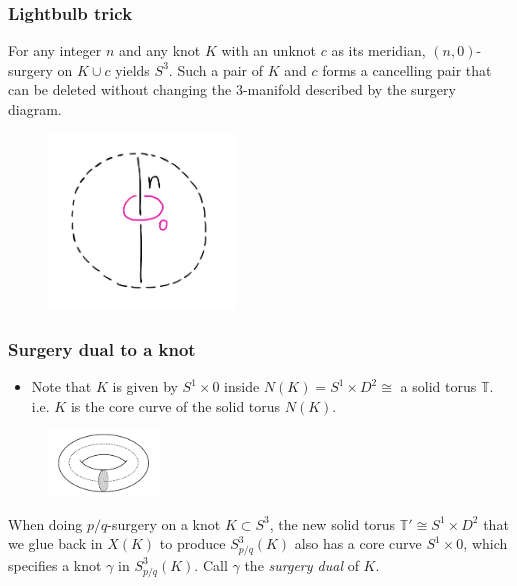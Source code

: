 \documentclass{beamer}
\theoremstyle{ex}
\theoremstyle{rem}
\begin{document}
\begin{frame}
	\frametitle{Lightbulb trick}
	\begin{theorem}
		For any integer $n$ and any knot $K$ with an unknot $c$ as its meridian, $(n, 0)$-surgery on $K \cup c$ yields $S^3$. Such a pair of $K$ and $c$ forms a cancelling pair that can be deleted without changing the $3$-manifold described by the surgery diagram.
	\end{theorem}
	\begin{figure}
		\centering
		\includegraphics[width=50mm]{Kc.jpg}
	\end{figure}
\end{frame}

\begin{frame}
	\frametitle{Surgery dual to a knot}
	\begin{itemize}
		\item Note that $K$ is given by $S^1 \times {0}$ inside $N(K) = S^1 \times D^2 \cong$ a solid torus $\mathbb{T}$. i.e. $K$ is the core curve of the solid torus $N(K)$. 
	\end{itemize}
	\begin{figure}
		\centering
		\includegraphics[width=30mm]{core.png}
	\end{figure}
	\begin{definition}
		When doing $p/q$-surgery on a knot $K \subset S^3$, the new solid torus $\mathbb{T'} \cong S^1 \times D^2$ that we glue back in $X(K)$ to produce $S^3_{p/q}(K)$ also has a core curve $S^1 \times {0}$, which specifies a knot $\gamma$ in $S^3_{p/q}(K)$. Call $\gamma$ the \textit{surgery dual} of $K$.
	\end{definition}		
\end{frame}
\end{document}
